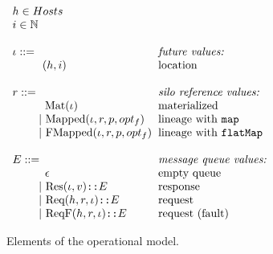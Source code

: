 \documentclass{article}
\theoremstyle{definition}
\newcommand{\gap}{\quad\quad}
\newcommand{\ba}{\begin{array}}
\newcommand{\ea}{\end{array}}
\begin{document}
\begin{figure}[ht!]
\centering

$\ba[t]{l@{\hspace{2mm}}l}
h \in Hosts                                         & \\   
i \in \mathbb{N}                                    & \\   
                                                    & \\   
\iota  ::=                                          & \mbox{{\it{future values:}}} \\
\gap \:\:\: (h, i)                                  & \mbox{location} \\   
                                                    & \\   
r ::=                                               & \mbox{{\it{silo reference values:}}} \\
\gap \:\:\:\: \text{Mat}(\iota)                     & \mbox{materialized} \\    
\gap ~|~  \text{Mapped}(\iota, r, p, opt_f)         & \mbox{lineage with \texttt{map}} \\    
\gap ~|~  \text{FMapped}(\iota, r, p, opt_f)        & \mbox{lineage with \texttt{flatMap}} \\   
                                                    & \\   
E      ::=                                          & \mbox{{\it{message queue values:}}} \\
\gap \:\:\:\: \epsilon                              & \mbox{empty queue} \\
\gap ~|~    \text{Res}(\iota, v) \texttt{::} E      & \mbox{response} \\
\gap ~|~    \text{Req}(h, r, \iota) \texttt{::} E   & \mbox{request}  \\
\gap ~|~    \text{ReqF}(h, r, \iota) \texttt{::} E  & \mbox{request (fault)} \\
\ea$

\caption{Elements of the operational model.}
\label{fig:elems-opsem}

\end{figure}

\end{document}
